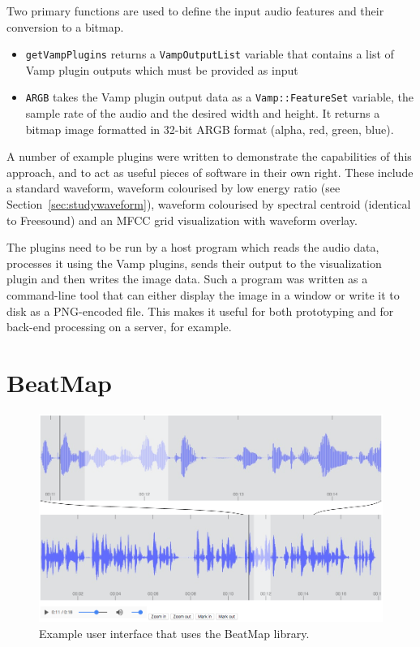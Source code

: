 Two primary functions are used to define the input audio features and their conversion to a bitmap.

\begin{itemize}
  \item \texttt{getVampPlugins} returns a \texttt{VampOutputList} variable that contains a list of Vamp plugin outputs
    which must be provided as input
  \item \texttt{ARGB} takes the Vamp plugin output data as a \texttt{Vamp::FeatureSet} variable, the sample rate of the
    audio and the desired width and height. It returns a bitmap image formatted in 32-bit ARGB format (alpha, red,
    green, blue).
\end{itemize}

A number of example plugins were written to demonstrate the capabilities of this approach, and to act as useful pieces
of software in their own right.  These include a standard waveform, waveform colourised by low energy ratio (see
Section~\ref{sec:studywaveform}), waveform colourised by spectral centroid (identical to Freesound) and an MFCC grid
visualization with waveform overlay.

The plugins need to be run by a host program which reads the audio data, processes it using the Vamp plugins, sends
their output to the visualization plugin and then writes the image data. Such a program was written as a command-line
tool that can either display the image in a window or write it to disk as a PNG-encoded file. This makes it useful for
both prototyping and for back-end processing on a server, for example.

\clearpage
\section{BeatMap}\label{sec:beatmap}

\begin{figure}[h]
\centering
  \includegraphics[width=\textwidth]{figs/beatmap.png}
  \caption{Example user interface that uses the BeatMap library.}
  \label{fig:beatmap}
\end{figure}
